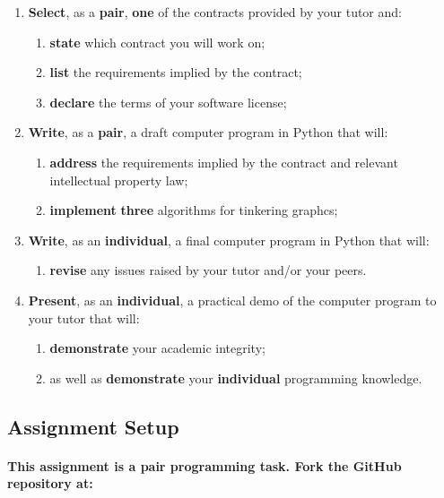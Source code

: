 \documentclass{../../fal_assignment}
\begin{document}
\begin{enumerate}
    \item \textbf{Select}, as a \textbf{pair}, \textbf{one} of the contracts provided by your tutor and:
    	\begin{enumerate}
    		\item \textbf{state} which contract you will work on;
    		\item \textbf{list} the requirements implied by the contract;
    		\item \textbf{declare} the terms of your software license;
	\end{enumerate}
    \item \textbf{Write}, as a \textbf{pair}, a draft computer program in Python that will:
    	\begin{enumerate}
    		\item \textbf{address} the requirements implied by the contract and relevant intellectual property law;
    		\item \textbf{implement} \textbf{three} algorithms for tinkering graphcs;
	\end{enumerate}
    \item \textbf{Write}, as an \textbf{individual}, a final computer program in Python that will:
    	\begin{enumerate}
    		\item \textbf{revise} any issues raised by your tutor and/or your peers.
	\end{enumerate}
    \item \textbf{Present}, as an \textbf{individual}, a practical demo of the computer program to your tutor that will:
    	\begin{enumerate}
    		\item \textbf{demonstrate} your academic integrity;
    		\item as well as \textbf{demonstrate} your \textbf{individual} programming knowledge.
	\end{enumerate}
\end{enumerate}

\subsection*{Assignment Setup}

\paragraph{This assignment is a \textbf{pair programming task}. Fork the GitHub repository at:}
\end{document}
